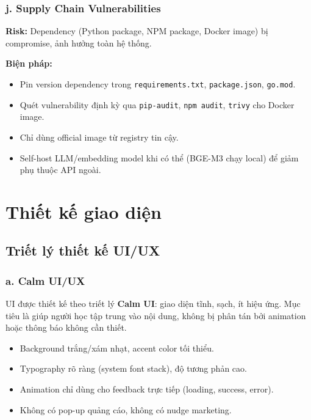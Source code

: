 \subsubsection*{j. Supply Chain Vulnerabilities}

\textbf{Risk:} Dependency (Python package, NPM package, Docker image) bị
compromise, ảnh hưởng toàn hệ thống.

\textbf{Biện pháp:}
\begin{itemize}
    \item Pin version dependency trong \texttt{requirements.txt},
          \texttt{package.json}, \texttt{go.mod}.
    \item Quét vulnerability định kỳ qua \texttt{pip-audit},
          \texttt{npm audit}, \texttt{trivy} cho Docker image.
    \item Chỉ dùng official image từ registry tin cậy.
    \item Self-host LLM/embedding model khi có thể (BGE-M3 chạy local) để
          giảm phụ thuộc API ngoài.
\end{itemize}

\section{Thiết kế giao diện}

\subsection{Triết lý thiết kế UI/UX}

\subsubsection*{a. Calm UI/UX}

UI được thiết kế theo triết lý \textbf{Calm UI}: giao diện tĩnh, sạch, ít
hiệu ứng. Mục tiêu là giúp người học tập trung vào nội dung, không bị
phân tán bởi animation hoặc thông báo không cần thiết.

\begin{itemize}
    \item Background trắng/xám nhạt, accent color tối thiểu.
    \item Typography rõ ràng (system font stack), độ tương phản cao.
    \item Animation chỉ dùng cho feedback trực tiếp (loading, success,
          error).
    \item Không có pop-up quảng cáo, không có nudge marketing.
\end{itemize}

